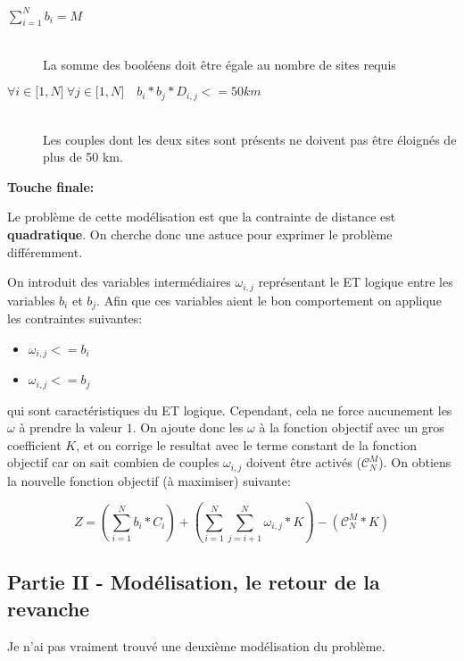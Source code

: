 \documentclass[a4paper]{article}
\begin{document}
\begin{description}
    \item[$\sum\limits_{i = 1}^{N}b_{i} = M$] \hfill \\
        La somme des booléens doit être égale au nombre de sites requis
    \item[$\forall i \in \lbrack1, N\rbrack\  \forall j \in \lbrack1, N\rbrack\quad  b_{i} * b_{j} * D_{i, j} <= 50km$] \hfill \\
        Les couples dont les deux sites sont présents ne doivent pas être
        éloignés de plus de 50 km.
\end{description}

\textbf{Touche finale:}

Le problème de cette modélisation est que la contrainte de distance est \textbf{quadratique}.
On cherche donc une astuce pour exprimer le problème différemment.

On introduit des variables intermédiaires $\omega_{i, j}$ représentant le ET logique
entre les variables $b_{i}$ et $b_{j}$. Afin que ces variables aient le bon comportement
on applique les contraintes suivantes:

\begin{itemize}
    \item[] $\omega_{i, j} <= b_{i}$
    \item[] $\omega_{i, j} <= b_{j}$
\end{itemize}

qui sont caractéristiques du ET logique. Cependant, cela ne force aucunement les
$\omega$ à prendre la valeur $1$. On ajoute donc les $\omega$ à la fonction
objectif avec un gros coefficient $K$, et on corrige le resultat avec le terme constant de la fonction objectif car
on sait combien de couples $\omega_{i, j}$ doivent être activés ($\mathcal{C}_{N}^{M}$).
On obtiens la nouvelle fonction objectif (à maximiser) suivante:

$$
Z = \left(\sum\limits_{i = 1}^{N}b_{i} * C_{i}\right)
+ \left(\sum\limits_{i = 1}^{N}\sum\limits_{j = i + 1}^{N} \omega_{i, j} * K\right)
- \left(\mathcal{C}_{N}^{M} * K\right)
$$

\subsection*{Partie II - Modélisation, le retour de la revanche}

Je n'ai pas vraiment trouvé une deuxième modélisation du problème.
\end{document}
